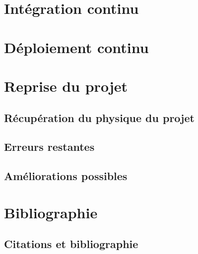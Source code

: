 \documentclass[
    iai, %
    il, %
]{heig-tb}
\begin{document}





\chapter{Intégration continu}


\chapter{Déploiement continu}

\chapter{Reprise du projet}

\section{Récupération du physique du projet}

\section{Erreurs restantes}

\section{Améliorations possibles}

\chapter{Bibliographie}
\section{Citations et bibliographie}
\end{document}
